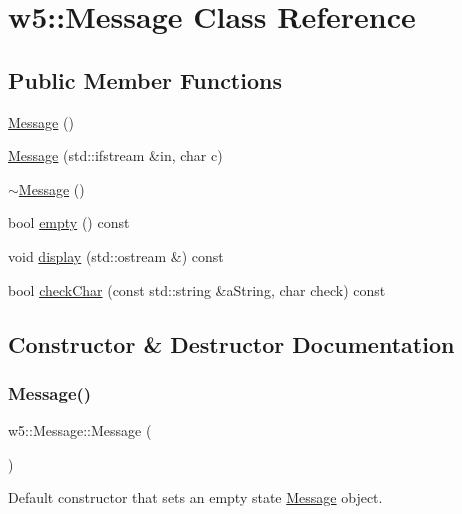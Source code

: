 \hypertarget{classw5_1_1Message}{}\section{w5\+:\+:Message Class Reference}
\label{classw5_1_1Message}
\subsection*{Public Member Functions}
\begin{DoxyCompactItemize}
\item 
\mbox{\hyperlink{classw5_1_1Message_aacab4dd9d90b0d5942e8ac0e6e0a722a}{Message}} ()
\item 
\mbox{\hyperlink{classw5_1_1Message_a669c79f1d7a90ee0a0f09516711481d4}{Message}} (std\+::ifstream \&in, char c)
\item 
\mbox{\hyperlink{classw5_1_1Message_a0d60457824644d8286e4805c04ebe193}{$\sim$\+Message}} ()
\item 
bool \mbox{\hyperlink{classw5_1_1Message_aeeb54ee5ef1fd404dfbf0c7ff3f1cbf7}{empty}} () const
\item 
void \mbox{\hyperlink{classw5_1_1Message_a9d438129067f04a078ae309d89bebb25}{display}} (std\+::ostream \&) const
\item 
bool \mbox{\hyperlink{classw5_1_1Message_acb21bb76b2afdb4e58823f8cf20ad762}{check\+Char}} (const std\+::string \&a\+String, char check) const
\end{DoxyCompactItemize}


\subsection{Constructor \& Destructor Documentation}
\mbox{\label{classw5_1_1Message_aacab4dd9d90b0d5942e8ac0e6e0a722a}} 
\subsubsection{\texorpdfstring{Message()}{Message()}\hspace{0.1cm}{\footnotesize\ttfamily [1/2]}}
{\footnotesize\ttfamily w5\+::\+Message\+::\+Message (\begin{DoxyParamCaption}{ }\end{DoxyParamCaption})}

Default constructor that sets an empty state \mbox{\hyperlink{classw5_1_1Message}{Message}} object. \mbox{\label{classw5_1_1Message_a669c79f1d7a90ee0a0f09516711481d4}} 
